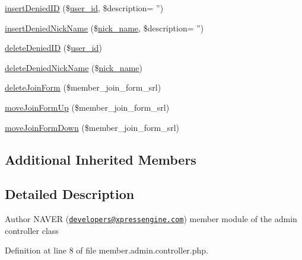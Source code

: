 \begin{DoxyCompactItemize}
\item 
\hyperlink{classmemberAdminController_ac60bb370f5cac395c99b05723ece5ccb}{insert\-Denied\-I\-D} (\$\hyperlink{ko_8install_8php_a74f1a394389d774e5b4cd5d1d15413f7}{user\-\_\-id}, \$description= '')
\item 
\hyperlink{classmemberAdminController_af3b39a52edd371b5dd5071987f25ed64}{insert\-Denied\-Nick\-Name} (\$\hyperlink{ko_8install_8php_a151ecae87a1f3d7e257aa089803086bd}{nick\-\_\-name}, \$description= '')
\item 
\hyperlink{classmemberAdminController_af7f02615adb1cbd7b8b91a330bda1a38}{delete\-Denied\-I\-D} (\$\hyperlink{ko_8install_8php_a74f1a394389d774e5b4cd5d1d15413f7}{user\-\_\-id})
\item 
\hyperlink{classmemberAdminController_a20792ed4ccef3abf09eb3fbd5dd955fb}{delete\-Denied\-Nick\-Name} (\$\hyperlink{ko_8install_8php_a151ecae87a1f3d7e257aa089803086bd}{nick\-\_\-name})
\item 
\hyperlink{classmemberAdminController_a3fbfbbc1a77c7aaaed901e08fd2ec09c}{delete\-Join\-Form} (\$member\-\_\-join\-\_\-form\-\_\-srl)
\item 
\hyperlink{classmemberAdminController_a6ab62c7dab973a7dc4d12b7739d82660}{move\-Join\-Form\-Up} (\$member\-\_\-join\-\_\-form\-\_\-srl)
\item 
\hyperlink{classmemberAdminController_a07d6306d7ed6eadca11fdc8ca9eb10d4}{move\-Join\-Form\-Down} (\$member\-\_\-join\-\_\-form\-\_\-srl)
\end{DoxyCompactItemize}
\subsection*{Additional Inherited Members}


\subsection{Detailed Description}
\begin{DoxyAuthor}{Author}
N\-A\-V\-E\-R (\href{mailto:developers@xpressengine.com}{\tt developers@xpressengine.\-com}) member module of the admin controller class 
\end{DoxyAuthor}


Definition at line 8 of file member.\-admin.\-controller.\-php.



